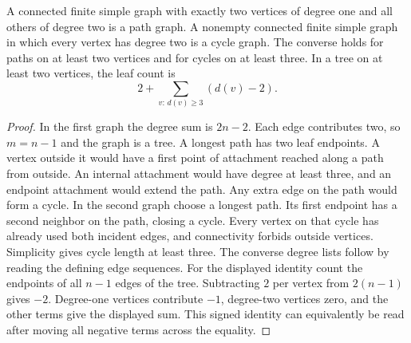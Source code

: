 \begin{corollary}\leavevmode\label{stprofile}
A connected finite simple graph with exactly two vertices of degree one and all others of degree two is a path graph. A nonempty connected finite simple graph in which every vertex has degree two is a cycle graph. The converse holds for paths on at least two vertices and for cycles on at least three. In a tree on at least two vertices, the leaf count is
\[
  2+\sum_{v:\,d(v)\ge3}(d(v)-2).
\]
\end{corollary}
\begin{proof}
In the first graph the degree sum is $2n-2$. Each edge contributes two, so $m=n-1$ and the graph is a tree. A longest path has two leaf endpoints. A vertex outside it would have a first point of attachment reached along a path from outside. An internal attachment would have degree at least three, and an endpoint attachment would extend the path. Any extra edge on the path would form a cycle. In the second graph choose a longest path. Its first endpoint has a second neighbor on the path, closing a cycle. Every vertex on that cycle has already used both incident edges, and connectivity forbids outside vertices. Simplicity gives cycle length at least three. The converse degree lists follow by reading the defining edge sequences. For the displayed identity count the endpoints of all $n-1$ edges of the tree. Subtracting $2$ per vertex from $2(n-1)$ gives $-2$. Degree-one vertices contribute $-1$, degree-two vertices zero, and the other terms give the displayed sum. This signed identity can equivalently be read after moving all negative terms across the equality.
\end{proof}

